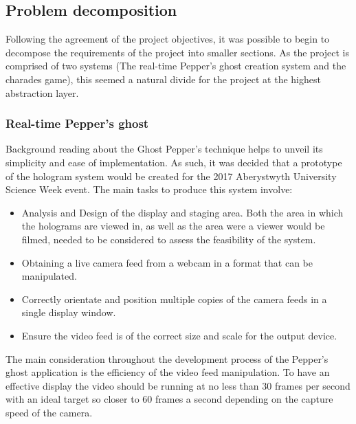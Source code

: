 \subsection{Problem decomposition}
Following the agreement of the project objectives, it was possible to begin to decompose the requirements of the project into smaller sections. As the project is comprised of two systems (The real-time Pepper's ghost creation system and the charades game), this seemed a natural divide for the project at the highest abstraction layer.

\subsubsection{Real-time Pepper's ghost}
Background reading about the Ghost Pepper's technique helps to unveil its simplicity and ease of implementation. As such, it was decided that a prototype of the hologram system would be created for the 2017 Aberystwyth University Science Week event. The main tasks to produce this system involve:
\begin{itemize}
	\item Analysis and Design of the display and staging area. Both the area in which the holograms are viewed in, as well as the area were a viewer would be filmed, needed to be considered to assess the feasibility of the system.
	\item Obtaining a live camera feed from a webcam in a format that can be manipulated.
	\item Correctly orientate and position multiple copies of the camera feeds in a single display window.
	\item Ensure the video feed is of the correct size and scale for the output device.
\end{itemize}

The main consideration throughout the development process of the Pepper's ghost application is the efficiency of the video feed manipulation. To have an effective display the video should be running at no less than 30 frames per second with an ideal target so closer to 60 frames a second depending on the capture speed of the camera.
 

